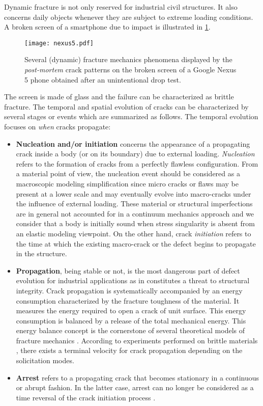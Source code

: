 Dynamic fracture is not only reserved for industrial civil structures. It also concerns daily objects whenever they are subject to extreme loading conditions. A broken screen of a smartphone due to impact is illustrated in \cref{fig:nexus5}.
\begin{figure}[htbp]
\centering
\texttt{[image: nexus5.pdf]}
\caption{Several (dynamic) fracture mechanics phenomena displayed by the \emph{post-mortem} crack patterns on the broken screen of a Google Nexus 5 phone obtained after an unintentional drop test.} \label{fig:nexus5}
\end{figure}
The screen is made of glass and the failure can be characterized as brittle fracture. The temporal and spatial evolution of cracks can be characterized by several stages or events which are summarized as follows. The temporal evolution focuses on \emph{when} cracks propagate:
\begin{itemize}
\item \textbf{Nucleation and/or initiation} concerns the appearance of a propagating crack inside a body (or on its boundary) due to external loading. \emph{Nucleation} refers to the formation of cracks from a perfectly flawless configuration. From a material point of view, the nucleation event should be considered as a macroscopic modeling simplification since micro cracks or flaws may be present at a lower scale and may eventually evolve into macro-cracks under the influence of external loading. These material or structural imperfections are in general not accounted for in a continuum mechanics approach and we consider that a body is initially sound when stress singularity is absent from an elastic modeling viewpoint. On the other hand, crack \emph{initiation} refers to the time at which the existing macro-crack or the defect begins to propagate in the structure.

\item \textbf{Propagation}, being stable or not, is the most dangerous part of defect evolution for industrial applications as in constitutes a threat to structural integrity. Crack propagation is systematically accompanied by an energy consumption characterized by the fracture toughness of the material. It measures the energy required to open a crack of unit surface. This energy consumption is balanced by a release of the total mechanical energy. This energy balance concept is the cornerstone of several theoretical models of fracture mechanics \cite{Griffith:1921,Mott:1947}. According to experiments performed on brittle materials \cite{Ravi-ChandarKnauss:1984a}, there exists a terminal velocity for crack propagation depending on the solicitation modes.

\item \textbf{Arrest} refers to a propagating crack that becomes stationary in a continuous or abrupt fashion. In the latter case, arrest can no longer be considered as a time reversal of the crack initiation process \cite{Ravi-ChandarKnauss:1984c}.
\end{itemize}

